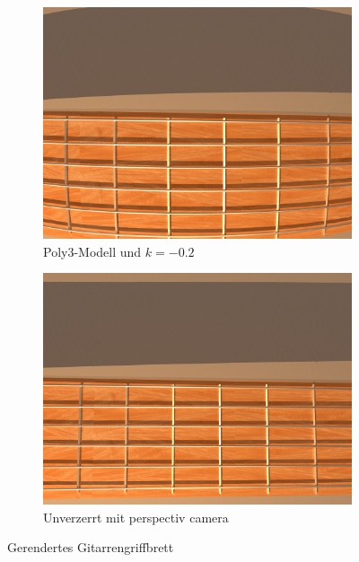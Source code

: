 \begin{figure}[h]
	\begin{subfigure}{.5\textwidth}
		\raggedleft
		\includegraphics[width=\textwidth]{img/guitarDistorted.png}
		\caption{Poly3-Modell und $k=-0.2$}
	\end{subfigure}
\begin{subfigure}{.5\textwidth}
		\raggedright
		\includegraphics[width=\textwidth, ]{img/guitarUndist.png}
		\caption{Unverzerrt mit perspectiv camera}
	\end{subfigure}
\caption{Gerendertes Gitarrengriffbrett}
\label{fig:Guitar}
\end{figure}


